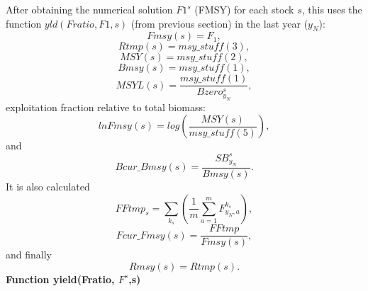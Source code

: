 \documentclass{article}
\begin{document}
After obtaining the numerical solution $F1^s$ (FMSY) for each stock $s$, this uses the function $yld(Fratio, F1,s)$ (from previous section) in the last year ($y_N$):
\begin{equation}
    Fmsy(s)=F_1,
\end{equation}
\begin{equation}
    Rtmp(s)=msy\_stuff(3),
\end{equation}
\begin{equation}
    MSY(s)=msy\_stuff(2),
\end{equation}
\begin{equation}
    Bmsy(s)=msy\_stuff(1),
\end{equation}
\begin{equation}
    MSYL(s)=\dfrac{msy\_stuff(1)}{Bzero^s_{y_N}},
\end{equation}
exploitation fraction relative to total biomass:
\begin{equation}
    lnFmsy(s)   = log\left(\dfrac{MSY(s)}{msy\_stuff(5)}\right),
\end{equation}
and
\begin{equation}
    Bcur\_Bmsy(s)= \dfrac{SB^s_{y_N}}{Bmsy(s)}.
\end{equation}
It is also calculated
\begin{equation}
    FFtmp_s=\sum_{k_s}\left(\dfrac{1}{m}\sum_{a=1}^mF^{k_s}_{y_N,a}\right),
\end{equation}
\begin{equation}
    Fcur\_Fmsy(s)= \dfrac{FFtmp}{Fmsy(s)},
\end{equation}
and finally
\begin{equation}
    Rmsy(s)     = Rtmp(s).
\end{equation}
\textbf{Function yield(Fratio, $F^s$,s)} \\
\end{document}
